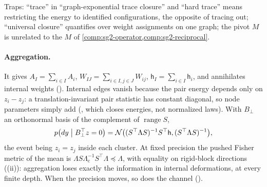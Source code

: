 Traps: ``trace'' in ``graph-exponential trace closure'' and ``hard trace'' means restricting the energy to
identified configurations, the opposite of tracing out; ``universal closure'' quantifies over weight assignments
on one graph; the pivot \(M\) is unrelated to the \(M\) of \cref{comp:sg2-operator,comp:sg2-reciprocal}.

\paragraph{Aggregation.} It gives \(A_I=\sum_{i\in I}A_i\), \(W_{IJ}=\sum_{i\in I,j\in J}W_{ij}\),
\(\mathsf h_I=\sum_{i\in I}\mathsf h_i\), and annihilates internal weights ().
Internal edges vanish because the pair energy depends only on \(z_i-z_j\): a translation-invariant pair statistic
has constant diagonal, so node parameters simply add (, which closes energies,
not normalized laws). With \(B_\perp\) an orthonormal basis of the complement of \(\operatorname{range}S\),
\[
p\bigl(dy\bigm|B_\perp^\top z=0\bigr)
=\mathcal N\bigl((S^\top\Lambda S)^{-1}S^\top\mathsf h,(S^\top\Lambda S)^{-1}\bigr),
\]
the event being \(z_i=z_j\) inside each cluster. At fixed precision the pushed Fisher metric of the mean is
\(\Lambda S\Lambda_{\mathrm c}^{-1}S^\top\Lambda\preceq\Lambda\), with equality on rigid-block directions
((ii)): aggregation loses exactly the information in internal deformations, at
every finite depth. When the precision moves, so does the channel ().

